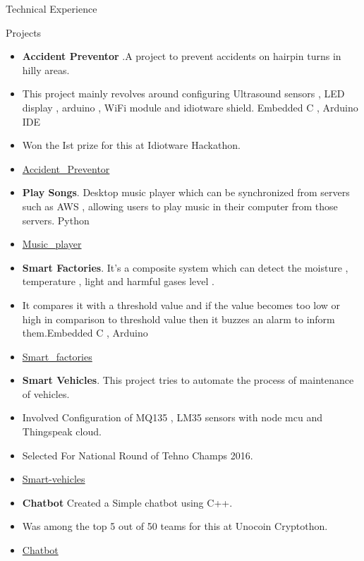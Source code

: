 \documentclass[]{mcdowellcv}
\begin{document}
	\begin{cvsection}{Technical Experience}
		\begin{cvsubsection}{Projects}{}{}
			\begin{itemize}
				\item \textbf{Accident Preventor} .A project to prevent accidents on hairpin turns in hilly areas.
				\item This project mainly revolves around configuring Ultrasound sensors , LED display , arduino , WiFi module and idiotware shield. Embedded C , Arduino IDE
				\item Won the Ist prize for this at Idiotware Hackathon. 
				\item \href{https://github.com/swekshajha12/Dodge_Hills}{Accident_Preventor}
				\item \textbf{Play Songs}. Desktop music player which can be synchronized from servers such as AWS , allowing users to play music in  their computer from those servers.  Python 
				\item \href{https://github.com/swekshajha12/compSpeakers}{Music_player}
				\item \textbf{Smart Factories}. It’s a composite system which can detect the moisture , temperature , light and harmful gases level . 
				\item It compares it with a threshold value and if the value becomes too low or high in comparison to threshold value then it buzzes an alarm to inform them.Embedded C , Arduino 
				\item \href{https://github.com/swekshajha12/IIOT}{Smart_factories}
				\item \textbf{Smart Vehicles}. This project tries to automate the process of maintenance of vehicles.
				\item Involved Configuration of MQ135 , LM35 sensors with node mcu and Thingspeak cloud.
				\item Selected For National Round of Tehno Champs 2016.
				\item \href{ https://github.com/swekshajha12/smart-tractors1}{Smart-vehicles}
				\item \textbf{Chatbot} Created a Simple chatbot using C++.
				\item Was among the top 5 out of 50 teams for this at Unocoin Cryptothon.
				\item \href{https://github.com/swekshajha12/chatbot}{Chatbot}
			\end{itemize}
		\end{cvsubsection}
	\end{cvsection}
	
\end{document}
